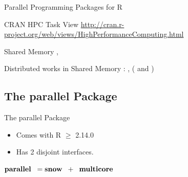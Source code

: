 \begin{frame}{Parallel Programming Packages for R}
  \begin{block}{CRAN HPC Task View}\small
    \url{http://cran.r-project.org/web/views/HighPerformanceComputing.html}
  \end{block}
  \begin{center}
    \begin{block}{Shared Memory}
      , 
    \end{block}
    \begin{block}{Distributed works in Shared Memory}
      \pbdR: ,  ( and
      ) 
    \end{block}
  \end{center}
\end{frame}




\subsection{The parallel Package}
\makesubcontentsslidessec

\begin{frame}
  \begin{block}{The parallel Package}
    \begin{itemize}
      \item Comes with R $\geq$ 2.14.0
      \item Has 2 disjoint interfaces.
    \end{itemize}
    \begin{center}
      $\textbf{parallel} \hspace{.2cm} = \textbf{snow} \hspace{.2cm} +
      \hspace{.2cm} \textbf{multicore}$ 
    \end{center}

  \end{block}
\end{frame}




